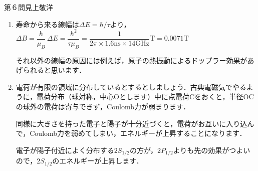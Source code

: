 \begin{answer}{第６問}{見上敬洋}
\begin{enumerate}
\item
  寿命から来る線幅は$\Delta E = \hbar/\tau$より，$\Delta B = \dfrac{\hbar}{\mu_B}\,\Delta E = \dfrac{\hbar^2}{\tau\mu_B} =  \dfrac{1}{2\pi\times 1.6 \mathrm{ns}\times 14\mathrm{GHz}} \mathrm{T} = 0.0071 \mathrm{T}$

  それ以外の線幅の原因には例えば，原子の熱振動によるドップラー効果があげられると思います．

\item
  電荷が有限の領域に分布しているとするとしましょう．古典電磁気でやるように，電荷分布（球対称，中心Oとします）中に点電荷Cをおくと，半径OCの球外の電荷は寄与できず，Coulomb力が弱まります．

  同様に大きさを持った電子と陽子が十分近づくと，電荷がお互いに入り込んで，Coulomb力を弱めてしまい，エネルギーが上昇することになります．

  電子が陽子付近によく分布する$2S_{1/2}$の方が，$2P_{1/2}$よりも先の効果がつよいので，$2S_{1/2}$のエネルギーが上昇します．
\end{enumerate}
\end{answer}
